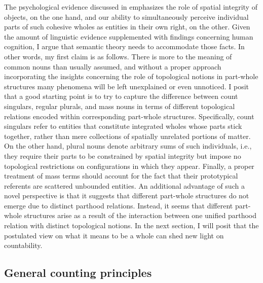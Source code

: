 The psychological evidence discussed in  emphasizes the role of spatial integrity of objects, on the one hand, and our ability to simultaneously perceive individual parts of such cohesive wholes as entities in their own right, on the other. Given the amount of linguistic evidence supplemented with findings concerning human cognition, I argue that semantic theory needs to accommodate those facts. In other words, my first claim is as follows. There is more to the meaning of common nouns than usually assumed, and without a proper approach incorporating the insights concerning the role of topological notions in part-whole structures many phenomena will be left unexplained or even unnoticed. I posit that a good starting point is to try to capture the difference between count singulars, regular plurals, and mass nouns in terms of different topological relations encoded within corresponding part-whole structures. Specifically, count singulars refer to entities that constitute integrated wholes whose parts stick together, rather than mere collections of spatially unrelated portions of matter. On the other hand, plural nouns denote arbitrary sums of such individuals, i.e., they require their parts to be constrained by spatial integrity but impose no topological restrictions on configurations in which they appear. Finally, a proper treatment of mass terms should account for the fact that their prototypical referents are scattered unbounded entities. An additional advantage of such a novel perspective is that it suggests that different part-whole structures do not emerge due to distinct parthood relations. Instead, it seems that different part-whole structures arise as a result of the interaction between one unified parthood relation with distinct topological notions. In the next section, I will posit that the postulated view on what it means to be a whole can shed new light on countability.

\subsection{General counting principles}\label{sec:general-counting-principles}

